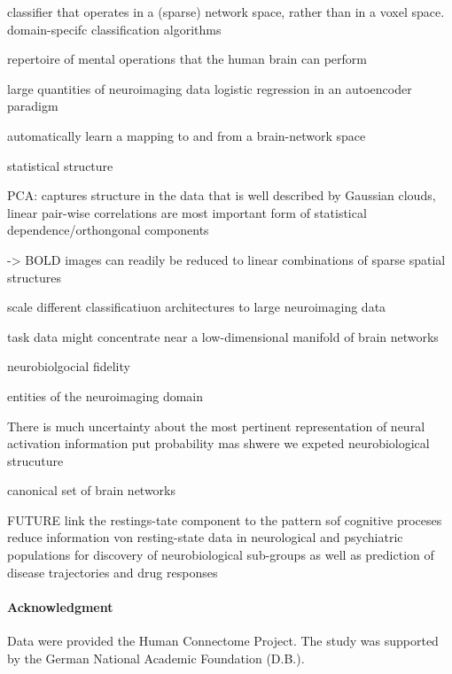 \documentclass{article} %
\begin{document}
classifier that operates in a (sparse) network space, rather than in a voxel space.
domain-specifc classification algorithms

repertoire of mental operations that the human brain can perform

large quantities of neuroimaging data
logistic regression in an autoencoder paradigm

automatically learn a mapping to and from a brain-network space

statistical structure

PCA:
captures structure in the data that is well described by Gaussian clouds,
linear pair-wise correlations are most important form of statistical
dependence/orthongonal components

-> BOLD images can readily be reduced to linear combinations of
sparse spatial structures

scale different classificatiuon architectures to large neuroimaging data

task data might concentrate near a low-dimensional manifold of brain networks

neurobiolgocial fidelity

entities of the neuroimaging domain

There is much uncertainty about the most pertinent representation
of neural activation information
put probability mas shwere we expeted neurobiological strucuture

canonical set of brain networks


FUTURE
link the restings-tate component to the pattern sof cognitive proceses
reduce information von resting-state data in neurological and psychiatric
populations for discovery of neurobiological sub-groups as well as
prediction of disease trajectories and drug responses


%
\paragraph{Acknowledgment}
{\small
Data were provided the Human Connectome Project. The study was supported
by the German National Academic Foundation (D.B.).
}


\small


\end{document}
